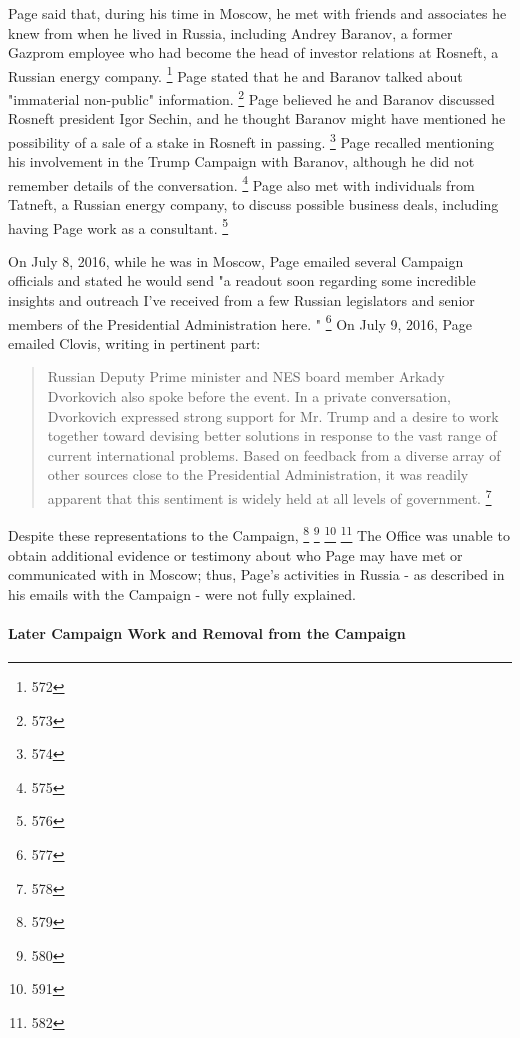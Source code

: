 Page said that, during his time in Moscow, he met with friends and associates he knew from when he lived in Russia, including Andrey Baranov, a former Gazprom employee who had become the head of investor relations at Rosneft, a Russian energy company.%
\footnote{572}
Page stated that he and Baranov talked about "immaterial non-public" information.%
\footnote{573}
Page believed he and Baranov discussed Rosneft president Igor Sechin, and he thought Baranov might have mentioned he possibility of a sale of a stake in Rosneft in passing.%
\footnote{574}
Page recalled mentioning his involvement in the Trump Campaign with Baranov, although he did not remember details of the conversation.%
\footnote{575}
Page also met with individuals from Tatneft, a Russian energy company, to discuss possible business deals, including having Page work as a consultant.%
\footnote{576}

On July 8, 2016, while he was in Moscow, Page emailed several Campaign officials and stated he would send "a readout soon regarding some incredible insights and outreach I've received from a few Russian legislators and senior members of the Presidential Administration here. "%
\footnote{577}
On July 9, 2016, Page emailed Clovis, writing in pertinent part:

\begin{quote}
Russian Deputy Prime minister and NES board member Arkady Dvorkovich also spoke before the event.
In a private conversation, Dvorkovich expressed strong support for Mr. Trump and a desire to work together toward devising better solutions in response to the vast range of current international problems.
Based on feedback from a diverse array of other sources close to the Presidential Administration, it was readily apparent that this sentiment is widely held at all levels of government.%
\footnote{578}
\end{quote}

Despite these representations to the Campaign,
\footnote{579}
\footnote{580}
\footnote{591}
\footnote{582}
The Office was unable to obtain additional evidence or testimony about who Page may have met or communicated with in Moscow; thus, Page's activities in Russia - as described in his emails with the Campaign - were not fully explained.

\paragraph{Later Campaign Work and Removal from the Campaign}

